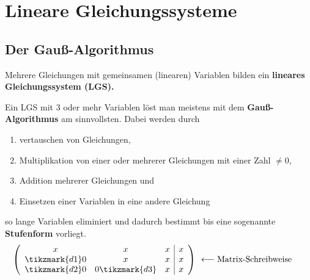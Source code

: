 \documentclass{article}
\begin{document}


\setcounter{section}{4}
\section{Lineare Gleichungssysteme}
\subsection{Der Gauß-Algorithmus}
Mehrere Gleichungen mit gemeinsamen (linearen) Variablen bilden ein
\textbf{lineares Gleichungssystem (LGS).}

Ein LGS mit 3 oder mehr Variablen löst man meistens mit dem 
\textbf{Gauß-Algorithmus} am sinnvollsten. Dabei werden durch
\begin{enumerate}
    \item vertauschen von Gleichungen,
    \item Multiplikation von einer oder mehrerer Gleichungen mit einer Zahl $\not= 0$,
    \item Addition mehrerer Gleichungen und
    \item Einsetzen einer Variablen in eine andere Gleichung
\end{enumerate}
so lange Variablen eliminiert und dadurch bestimmt bis eine sogenannte
\textbf{Stufenform} vorliegt.
\[\left( \begin{array}{ccc|c} x & x & x & x \\ \tikzmark{d1}0 & x & x  & x \\ \tikzmark{d2}0 & 0\tikzmark{d3} & x & x \end{array} \right) \begin{array}{cc}
    &\\
    \longleftarrow \text{Matrix-Schreibweise} &\\
    &
\end{array}\]
\end{document}
